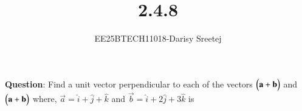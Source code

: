 \documentclass[journal]{IEEEtran}
\begin{document}

\vspace{3cm}

\title{2.4.8}
\author{EE25BTECH11018-Darisy Sreetej}
 \maketitle
{\let\newpage\relax\maketitle}

\renewcommand{\thefigure}{\theenumi}
\renewcommand{\thetable}{\theenumi}
\setlength{\intextsep}{10pt} %


\renewcommand{\thetable}{\theenumi}

\textbf{Question}:
Find a unit vector perpendicular to each of the vectors $\begin{pmatrix}\mathbf{a}+\mathbf{b}\end{pmatrix}$ and $\begin{pmatrix}\mathbf{a}+\mathbf{b}\end{pmatrix}$ where, $\vec{a} = \hat{i} + \hat{j} + \hat{k}$ and $\vec{b} = \hat{i} + 2\hat{j} + 3\hat{k} $ is

\quad
\end{document}
